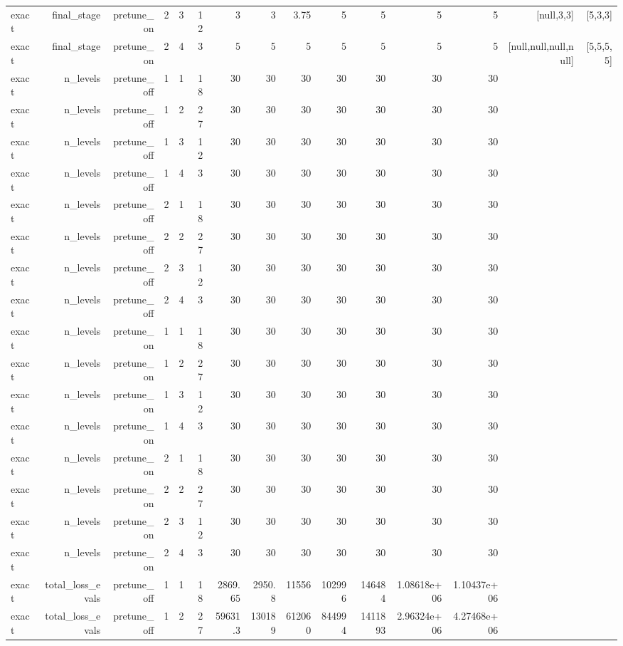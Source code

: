\begin{table}[htbp]
\begin{tabular}{lrrrrrrrrrrrrrr}
exact & final\_stage & pretune\_on & 2 & 3 & 12 & 3 & 3 & 3.75 & 5 & 5 & 5 & 5 & [null,3,3] & [5,3,3] \\
exact & final\_stage & pretune\_on & 2 & 4 & 3 & 5 & 5 & 5 & 5 & 5 & 5 & 5 & [null,null,null,null] & [5,5,5,5] \\
exact & n\_levels & pretune\_off & 1 & 1 & 18 & 30 & 30 & 30 & 30 & 30 & 30 & 30 &  &  \\
exact & n\_levels & pretune\_off & 1 & 2 & 27 & 30 & 30 & 30 & 30 & 30 & 30 & 30 &  &  \\
exact & n\_levels & pretune\_off & 1 & 3 & 12 & 30 & 30 & 30 & 30 & 30 & 30 & 30 &  &  \\
exact & n\_levels & pretune\_off & 1 & 4 & 3 & 30 & 30 & 30 & 30 & 30 & 30 & 30 &  &  \\
exact & n\_levels & pretune\_off & 2 & 1 & 18 & 30 & 30 & 30 & 30 & 30 & 30 & 30 &  &  \\
exact & n\_levels & pretune\_off & 2 & 2 & 27 & 30 & 30 & 30 & 30 & 30 & 30 & 30 &  &  \\
exact & n\_levels & pretune\_off & 2 & 3 & 12 & 30 & 30 & 30 & 30 & 30 & 30 & 30 &  &  \\
exact & n\_levels & pretune\_off & 2 & 4 & 3 & 30 & 30 & 30 & 30 & 30 & 30 & 30 &  &  \\
exact & n\_levels & pretune\_on & 1 & 1 & 18 & 30 & 30 & 30 & 30 & 30 & 30 & 30 &  &  \\
exact & n\_levels & pretune\_on & 1 & 2 & 27 & 30 & 30 & 30 & 30 & 30 & 30 & 30 &  &  \\
exact & n\_levels & pretune\_on & 1 & 3 & 12 & 30 & 30 & 30 & 30 & 30 & 30 & 30 &  &  \\
exact & n\_levels & pretune\_on & 1 & 4 & 3 & 30 & 30 & 30 & 30 & 30 & 30 & 30 &  &  \\
exact & n\_levels & pretune\_on & 2 & 1 & 18 & 30 & 30 & 30 & 30 & 30 & 30 & 30 &  &  \\
exact & n\_levels & pretune\_on & 2 & 2 & 27 & 30 & 30 & 30 & 30 & 30 & 30 & 30 &  &  \\
exact & n\_levels & pretune\_on & 2 & 3 & 12 & 30 & 30 & 30 & 30 & 30 & 30 & 30 &  &  \\
exact & n\_levels & pretune\_on & 2 & 4 & 3 & 30 & 30 & 30 & 30 & 30 & 30 & 30 &  &  \\
exact & total\_loss\_evals & pretune\_off & 1 & 1 & 18 & 2869.65 & 2950.8 & 11556 & 102996 & 146484 & 1.08618e+06 & 1.10437e+06 &  &  \\
exact & total\_loss\_evals & pretune\_off & 1 & 2 & 27 & 59631.3 & 130189 & 612060 & 844994 & 1411893 & 2.96324e+06 & 4.27468e+06 &  &  \\

\end{tabular}
\end{table}
